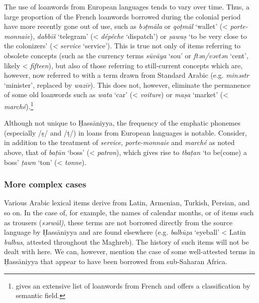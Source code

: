 \documentclass[output=paper]{langsci/langscibook}
\begin{document}

The use of loanwords from European languages tends to vary over time. Thus, a large proportion of the French loanwords borrowed during the colonial period have more recently gone out of use, such as \textit{bə{\R}ṭmāla} or \textit{qo{\R}ṭmāl} ‘wallet’ (< \textit{porte-monnaie}), \textit{dabbīš} ‘telegram’ (< \textit{dépêche} ‘dispatch’) or \textit{ṣa{\R}waṣ} ‘to be very close to the colonizers’ (\textit{<} \textit{service} ‘service’). This is true not only of items referring to obsolete concepts (such as the currency terms \textit{sūvāya} ‘sou’ or \textit{ftən/vəvtən} ‘cent’, likely < \textit{fifteen}), but also of those referring to still-current concepts which are, however, now referred to with a term drawn from Standard Arabic (e.g. \textit{minəstr} ‘minister’, replaced by \textit{wazīr}). This does not, however, eliminate the permanence of some old loanwords such as \textit{wata} ‘car’ (< \textit{voiture}) or \textit{ma{\R}ṣa} ‘market’ (< \textit{marché}).\footnote{\citet{OuldMohamedBaba2003} gives an extensive list of loanwords from French and offers a classification by semantic field.}

Although not unique to Ḥassāniyya, the frequency of the emphatic phonemes (especially /ṣ/ and /ṭ/) in loans from European languages is notable. Consider, in addition to the treatment of \textit{service}, \textit{porte-monnaie} and \textit{marché} as noted above, that of \textit{baṭ{\R}ūn} ‘boss’ (< \textit{patron}), which gives rise to \textit{tbaṭ{\R}an} ‘to be(come) a boss’ \textit{ṭawn} ‘ton’ (< \textit{tonne}).

\subsubsection{More complex cases} %

 \label{wander}

Various Arabic lexical items derive from Latin, Armenian, Turkish, Persian, and so on. In the case of, for example, the names of calendar months, or of items such as trousers (\textit{sərwāl)}, these terms are not borrowed directly from the source language by Ḥassāniyya and are found elsewhere (e.g. \textit{balbūẓa} ‘eyeball’ < Latin \textit{bulbus}, attested throughout the Maghreb). The history of such items will not be dealt with here. We can, however, mention the case of some well-attested terms in Ḥassāniyya that appear to have been borrowed from sub-Saharan Africa.
\end{document}
